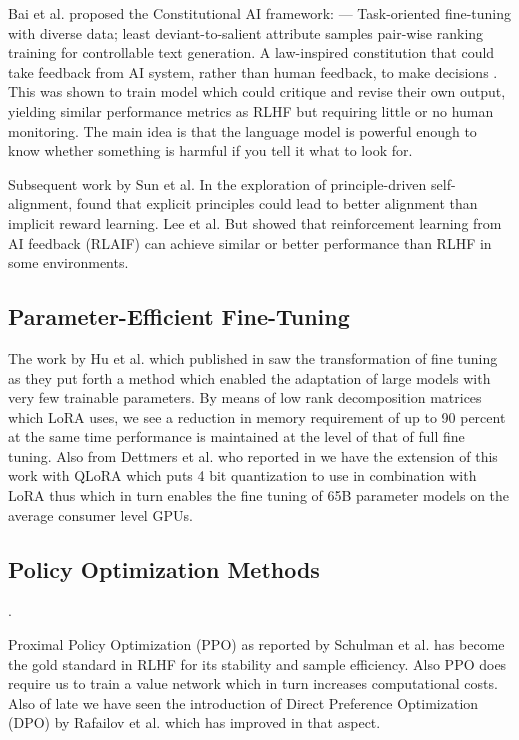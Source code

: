 \documentclass[conference]{IEEEtran}
\begin{document}
Bai et al. proposed the Constitutional AI framework: — Task-oriented fine-tuning with diverse data; least deviant-to-salient attribute samples pair-wise ranking training for controllable text generation. A law-inspired constitution that could take feedback from AI system, rather than human feedback, to make decisions \cite{bai2022constitutional}. This was shown to train model which could critique and revise their own output, yielding similar performance metrics as RLHF but requiring little or no human monitoring. The main idea is that the language model is powerful enough to know whether something is harmful if you tell it what to look for.

Subsequent work by Sun et al. In the exploration of principle-driven self-alignment, \cite{sun2023principle} found that explicit principles could lead to better alignment than implicit reward learning. Lee et al. But \cite{lee2023rlaif} showed that reinforcement learning from AI feedback (RLAIF) can achieve similar or better performance than RLHF in some environments.

\subsection{Parameter-Efficient Fine-Tuning}

The work by Hu et al. which published in \cite{hu2021lora} saw the transformation of fine tuning as they put forth a method which enabled the adaptation of large models with very few trainable parameters. By means of low rank decomposition matrices which LoRA uses, we see a reduction in memory requirement of up to 90 percent at the same time performance is maintained at the level of that of full fine tuning. Also from Dettmers et al. who reported in \cite{dettmers2023qlora} we have the extension of this work with QLoRA which puts 4 bit quantization to use in combination with LoRA thus which in turn enables the fine tuning of 65B parameter models on the average consumer level GPUs. 

\subsection{Policy Optimization Methods}.

Proximal Policy Optimization (PPO) as reported by Schulman et al. \cite{schulman2017proximal} has become the gold standard in RLHF for its stability and sample efficiency. Also PPO does require us to train a value network which in turn increases computational costs. Also of late we have seen the introduction of Direct Preference Optimization (DPO) by Rafailov et al. \cite{rafailov2023direct} which has improved in that aspect. 
\end{document}
